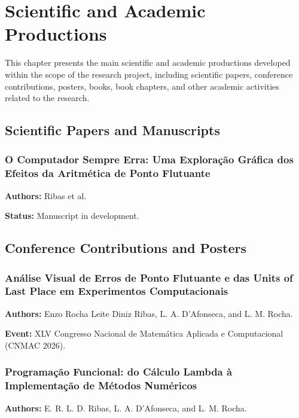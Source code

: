 \chapter{Scientific and Academic Productions}
\label{cap:Scientific_Productions}

This chapter presents the main scientific and academic productions developed
within the scope of the research project, including scientific papers,
conference contributions, posters, books, book chapters, and other academic
activities related to the research.

\section{Scientific Papers and Manuscripts}

\subsection*{O Computador Sempre Erra: Uma Exploração Gráfica dos Efeitos da
Aritmética de Ponto Flutuante}

\textbf{Authors:} Ribas et al.

\textbf{Status:} Manuscript in development.

\section{Conference Contributions and Posters}

\subsection*{Análise Visual de Erros de Ponto Flutuante e das Units of Last
Place em Experimentos Computacionais}

\textbf{Authors:} Enzo Rocha Leite Diniz Ribas, L. A. D'Afonseca, and
L. M. Rocha.

\textbf{Event:} XLV Congresso Nacional de Matemática Aplicada e Computacional
(CNMAC 2026).

\subsection*{Programação Funcional: do Cálculo Lambda à Implementação de
Métodos Numéricos}

\textbf{Authors:} E. R. L. D. Ribas, L. A. D'Afonseca, and L. M. Rocha.

